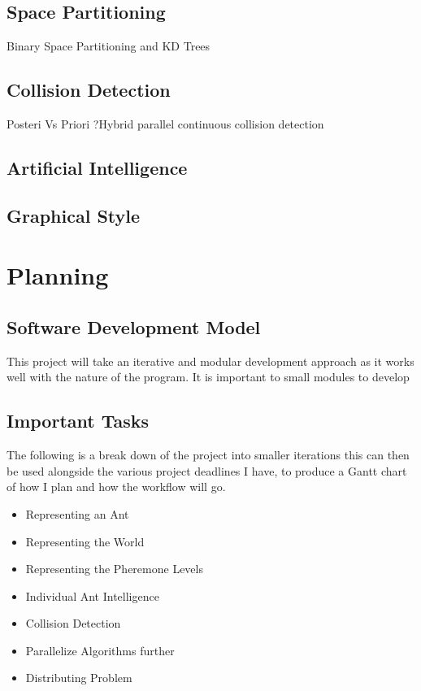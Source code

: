 \documentclass{report}
\begin{document}
\section {Space Partitioning}
Binary Space Partitioning and KD Trees
\section{Collision Detection}
Posteri Vs Priori
?Hybrid parallel continuous collision detection
\section{Artificial Intelligence} 

\section{Graphical Style}

\chapter{Planning}

\section{Software Development Model}
This project will take an iterative and modular development approach as it works well with the nature of the program. It is important to small modules to develop 

\section{Important Tasks}
The following is a break down of the project into smaller iterations this can then be used alongside the various project deadlines I have, to produce a Gantt chart of how I plan and how the workflow will go.
\begin{itemize}
	\item Representing an Ant
	\item Representing the World
	\item Representing the Pheremone Levels
	\item Individual Ant Intelligence
	\item Collision Detection
	\item Parallelize Algorithms further
	\item Distributing Problem
\end{itemize}
\end{document}
